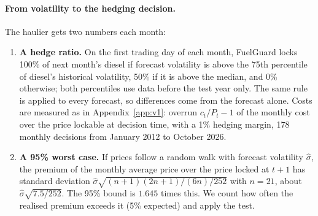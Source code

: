 \paragraph{From volatility to the hedging decision.} The haulier gets two numbers each month:
\begin{enumerate}
\item \textbf{A hedge ratio.} On the first trading day of each month, FuelGuard locks 100\% of next month's
diesel if forecast volatility is above the 75th percentile of diesel's historical volatility, 50\% if it is
above the median, and 0\% otherwise; both percentiles use data before the test year only. The same rule is
applied to every forecast, so differences come from the forecast alone. Costs are measured as in
Appendix~\ref{app:v1}: overrun $c_t/P_t-1$ of the monthly cost over the price lockable at decision time,
with a 1\% hedging margin, 178 monthly decisions from January 2012 to October 2026.
\item \textbf{A 95\% worst case.} If prices follow a random walk with forecast volatility $\hat\sigma$, the
premium of the monthly average price over the price locked at $t+1$ has standard deviation
$\hat\sigma\sqrt{(n+1)(2n+1)/(6n)/252}$ with $n=21$, about $\hat\sigma\sqrt{7.5/252}$. The 95\% bound is
$1.645$ times this. We count how often the realised premium exceeds it (5\% expected) and apply the
\citet{kupiec1995} test.
\end{enumerate}
